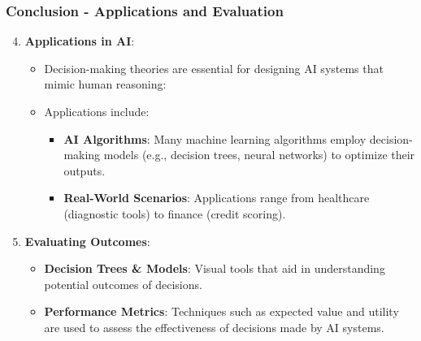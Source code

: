 \documentclass[aspectratio=169]{beamer}
\begin{document}
\begin{frame}[fragile]
    \frametitle{Conclusion - Applications and Evaluation}

    \begin{enumerate}
        \setcounter{enumi}{3} %
        
        \item \textbf{Applications in AI}:
            \begin{itemize}
                \item Decision-making theories are essential for designing AI systems that mimic human reasoning:
                \item Applications include:
                    \begin{itemize}
                        \item \textbf{AI Algorithms}: Many machine learning algorithms employ decision-making models (e.g., decision trees, neural networks) to optimize their outputs.
                        \item \textbf{Real-World Scenarios}: Applications range from healthcare (diagnostic tools) to finance (credit scoring).
                    \end{itemize}
            \end{itemize}

        \item \textbf{Evaluating Outcomes}:
            \begin{itemize}
                \item \textbf{Decision Trees \& Models}: Visual tools that aid in understanding potential outcomes of decisions.
                \item \textbf{Performance Metrics}: Techniques such as expected value and utility are used to assess the effectiveness of decisions made by AI systems.
            \end{itemize}
    \end{enumerate}
    
\end{frame}
\end{document}
